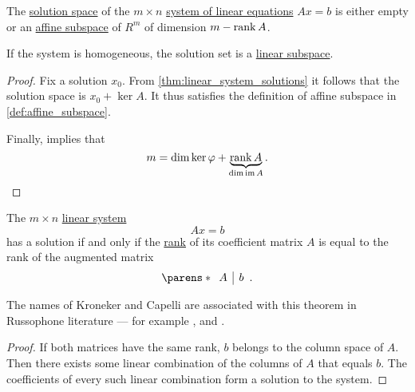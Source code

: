\begin{corollary}\label{thm:linear_system_solution_space}
  The \hyperref[def:system_of_linear_equations/solution_space]{solution space} of the \( m \times n \) \hyperref[def:system_of_linear_equations]{system of linear equations} \( Ax = b \) is either empty or an \hyperref[def:affine_subspace]{affine subspace} of \( R^m \) of dimension \( m - \operatorname{rank} A \).

  If the system is homogeneous, the solution set is a \hyperref[def:module/submodel]{linear subspace}.
\end{corollary}
\begin{proof}
  Fix a solution \( x_0 \). From \cref{thm:linear_system_solutions} it follows that the solution space is \( x_0 + \ker A \). It thus satisfies the definition of affine subspace in \cref{def:affine_subspace}.

  Finally,  implies that
  \begin{equation*}
    m = \dim \ker \varphi + \underbrace{ \operatorname{rank} A }_{ \dim \operatorname{im} A }.
  \end{equation*}
\end{proof}

\begin{theorem}\label{thm:kroneker_capelli}
  The \( m \times n \) \hyperref[def:system_of_linear_equations]{linear system}
  \begin{equation*}
    Ax = b
  \end{equation*}
  has a solution if and only if the \hyperref[def:rank_and_nullity]{rank} of its coefficient matrix \( A \) is equal to the rank of the augmented matrix
  \begin{equation*}
    \parens*
    {
      \begin{array}{c|c}
        A & b
      \end{array}
    }.
  \end{equation*}
\end{theorem}
\begin{comments}
  \item The names of Kroneker and Capelli are associated with this theorem in Russophone literature --- for example ,  and .
\end{comments}
\begin{proof}
  If both matrices have the same rank, \( b \) belongs to the column space of \( A \). Then there exists some linear combination of the columns of \( A \) that equals \( b \). The coefficients of every such linear combination form a solution to the system.
\end{proof}
